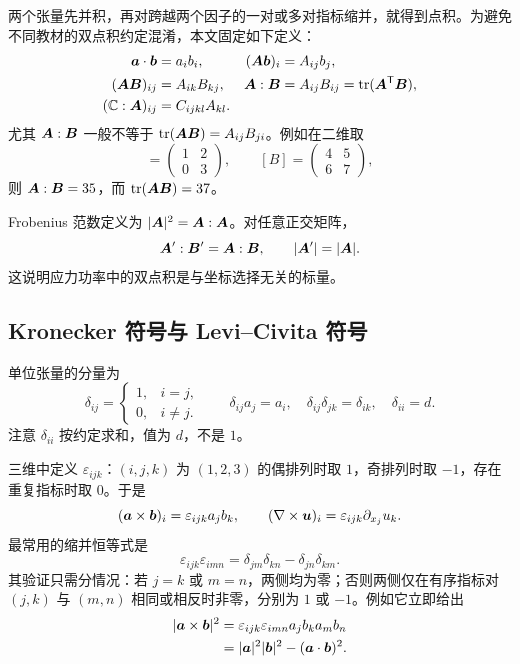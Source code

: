 两个张量先并积，再对跨越两个因子的一对或多对指标缩并，就得到点积。为避免不同教材的双点积约定混淆，本文固定如下定义：
\begin{align}
 \bm{a}\cdot\bm{b}&=a_ib_i,&
 (\bm{A}\bm{b})_i&=A_{ij}b_j,\\
 (\bm{A}\bm{B})_{ij}&=A_{ik}B_{kj},&
 \bm{A}:\bm{B}&=A_{ij}B_{ij}=\operatorname{tr}(\bm{A}^{\mathsf T}\bm{B}),\label{eq:tensor-double-dot}\\
 (\mathbb C:\bm{A})_{ij}&=C_{ijkl}A_{kl}.&&
\end{align}
尤其 $\bm{A}:\bm{B}$ 一般不等于 $\operatorname{tr}(\bm{A}\bm{B})=A_{ij}B_{ji}$。例如在二维取
\begin{equation}
 [A]=\begin{pmatrix}1&2\\0&3\end{pmatrix},\qquad
 [B]=\begin{pmatrix}4&5\\6&7\end{pmatrix},
\end{equation}
则 $\bm{A}:\bm{B}=35$，而 $\operatorname{tr}(\bm{A}\bm{B})=37$。

Frobenius 范数定义为 $|\bm{A}|^2=\bm{A}:\bm{A}$。对任意正交矩阵，
\begin{equation}
 \bm{A}':\bm{B}'=\bm{A}:\bm{B},
 \qquad |\bm{A}'|=|\bm{A}|.
\end{equation}
这说明应力功率中的双点积是与坐标选择无关的标量。

\subsection{Kronecker 符号与 Levi--Civita 符号}

单位张量的分量为
\begin{equation}
 \delta_{ij}=\begin{cases}1,&i=j,\\0,&i\ne j.\end{cases}
 \qquad \delta_{ij}a_j=a_i,\quad
 \delta_{ij}\delta_{jk}=\delta_{ik},\quad\delta_{ii}=d.
\end{equation}
注意 $\delta_{ii}$ 按约定求和，值为 $d$，不是 $1$。

三维中定义 $\varepsilon_{ijk}$：$(i,j,k)$ 为 $(1,2,3)$ 的偶排列时取 $1$，奇排列时取 $-1$，存在重复指标时取 $0$。于是
\begin{equation}
 (\bm{a}\times\bm{b})_i=\varepsilon_{ijk}a_jb_k,
 \qquad (\nabla\times\bm{u})_i=\varepsilon_{ijk}\partial_{x_j}u_k.
\end{equation}
最常用的缩并恒等式是
\begin{equation}
 \varepsilon_{ijk}\varepsilon_{imn}
 =\delta_{jm}\delta_{kn}-\delta_{jn}\delta_{km}.
 \label{eq:epsilon-delta}
\end{equation}
其验证只需分情况：若 $j=k$ 或 $m=n$，两侧均为零；否则两侧仅在有序指标对 $(j,k)$ 与 $(m,n)$ 相同或相反时非零，分别为 $1$ 或 $-1$。例如它立即给出
\begin{align}
 |\bm{a}\times\bm{b}|^2
 &=\varepsilon_{ijk}\varepsilon_{imn}a_jb_ka_mb_n\\
 &=|\bm{a}|^2|\bm{b}|^2-(\bm{a}\cdot\bm{b})^2.
\end{align}

